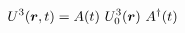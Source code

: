 \begin{equation}
U^3(\mbox{\boldmath$r$},t) = A(t)~U_0^3(\mbox{\boldmath$r$})~A^\dag(t)
\end{equation}

